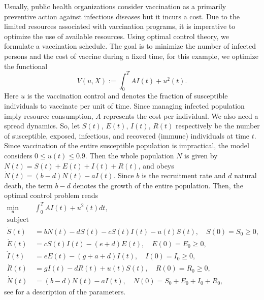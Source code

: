 Usually, public health organizations consider vaccination as a
primarily preventive action against infectious diseases but it incurs a cost.%
Due to the limited resources associated with vaccination programs, it is imperative
to optimize the use of available resources. Using optimal control theory, we
formulate a vaccination schedule. The goal is to minimize the number of infected
persons and the cost of vaccine during a fixed time, for this example, we 
optimize the functional
$$
  V(u, X):= 
  \int_{0}^{T}
    A I(t) + u^2(t) .
$$
Here $u$ is the vaccination control and denotes the fraction of
susceptible individuals to vaccinate per unit of time. Since managing infected 
population imply resource consumption, $A$ represents the cost per individual.
We also need a spread dynamics. So, let $S(t)$, $E(t)$, $I(t)$, $R(t)$
respectively be the number of susceptible, exposed, infectious, and recovered
(immune) individuals at time $t$. Since vaccination of
the entire susceptible population is impractical, the model considers 
$0 \leq u(t) \leq 0.9$. Then the whole population $N$ is given by 
$N(t) = S(t) + E(t) + I(t) + R (t)$, and obeys
$
  \dot{N}(t) =
    (b - d)N(t) - aI(t).
$
Since $b$ is the recruitment rate and $d$ natural death, the term $b-d$ denotes 
the growth of the entire population. Then, the optimal control problem reads
%
%
\begin{equation} \label{eqn:epidemics_lenhart}
  \begin{aligned}
    \min_{u} & \int_{0}^{T} AI(t) + u^{2}(t) dt,
    \\
    \text{subject to}
    \\
      \dot{S}(t) &=
          bN(t) - dS(t) - cS(t)I(t) - u(t)S(t), \quad S(0) = S_0 \geq 0,   \\
      \dot{E}(t) &=
          cS(t)I(t) - (e + d)E(t), \quad E(0) = E_0 \geq 0,    \\
      \dot{I}(t) &=
          eE(t) - (g + a +d)I(t), \quad I(0) = I_0 \geq 0,     \\
      \dot{R}(t) &=
          gI(t) -dR(t) + u(t)S(t), \quad R(0) = R_0 \geq 0,    \\
        \dot{N}(t) &=
          (b - d)N(t) - aI(t), \quad N(0)= S_0 + E_0 + I_0 + R_0, 
  \end{aligned}
\end{equation}
see  for a description of the parameters.

